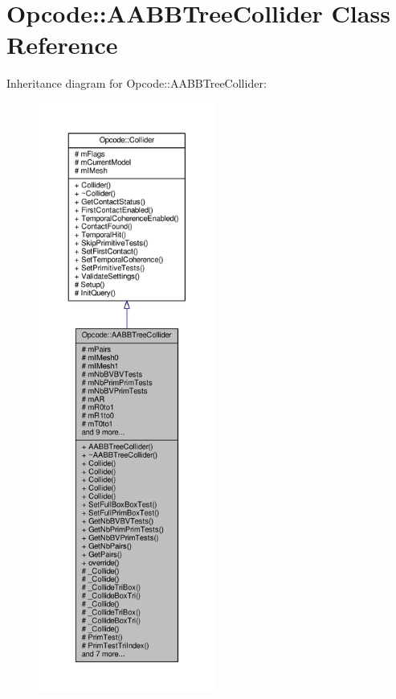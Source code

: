 \hypertarget{classOpcode_1_1AABBTreeCollider}{}\section{Opcode\+:\+:A\+A\+B\+B\+Tree\+Collider Class Reference}
\label{classOpcode_1_1AABBTreeCollider}


Inheritance diagram for Opcode\+:\+:A\+A\+B\+B\+Tree\+Collider\+:
\nopagebreak
\begin{figure}[H]
\begin{center}
\leavevmode
\includegraphics[height=550pt]{de/dd3/classOpcode_1_1AABBTreeCollider__inherit__graph}
\end{center}
\end{figure}


